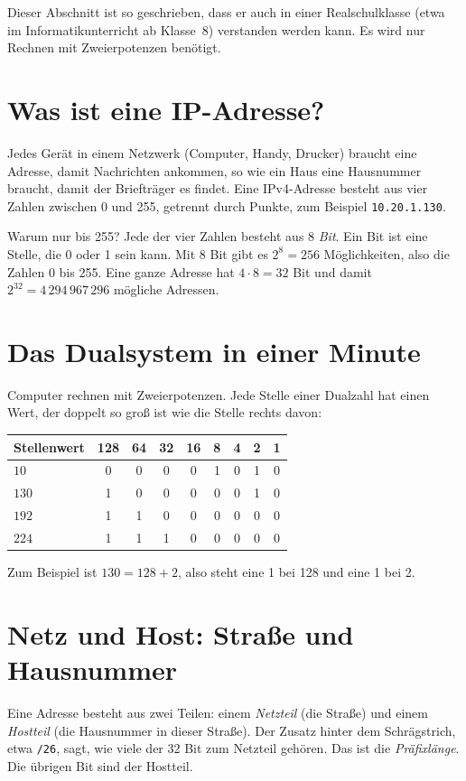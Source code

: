 \documentclass[a4paper,12pt, twoside]{report}
\theoremstyle{definition}
\begin{document}
Dieser Abschnitt ist so geschrieben, dass er auch in einer Realschulklasse (etwa im Informatikunterricht ab Klasse~8) verstanden werden kann. Es wird nur Rechnen mit Zweierpotenzen benötigt.

\section{Was ist eine IP-Adresse?}

Jedes Gerät in einem Netzwerk (Computer, Handy, Drucker) braucht eine Adresse, damit Nachrichten ankommen, so wie ein Haus eine Hausnummer braucht, damit der Briefträger es findet. Eine IPv4-Adresse besteht aus vier Zahlen zwischen 0 und 255, getrennt durch Punkte, zum Beispiel \texttt{10.20.1.130}.

Warum nur bis 255? Jede der vier Zahlen besteht aus 8 \emph{Bit}. Ein Bit ist eine Stelle, die 0 oder 1 sein kann. Mit 8 Bit gibt es $2^8 = 256$ Möglichkeiten, also die Zahlen 0 bis 255. Eine ganze Adresse hat $4\cdot 8 = 32$ Bit und damit $2^{32} = 4\,294\,967\,296$ mögliche Adressen.

\section{Das Dualsystem in einer Minute}

Computer rechnen mit Zweierpotenzen. Jede Stelle einer Dualzahl hat einen Wert, der doppelt so groß ist wie die Stelle rechts davon:
\begin{center}
\begin{tabular}{lcccccccc}
\toprule
Stellenwert & 128 & 64 & 32 & 16 & 8 & 4 & 2 & 1 \\
\midrule
$10$ & 0 & 0 & 0 & 0 & 1 & 0 & 1 & 0 \\
$130$ & 1 & 0 & 0 & 0 & 0 & 0 & 1 & 0 \\
$192$ & 1 & 1 & 0 & 0 & 0 & 0 & 0 & 0 \\
$224$ & 1 & 1 & 1 & 0 & 0 & 0 & 0 & 0 \\
\bottomrule
\end{tabular}
\end{center}
Zum Beispiel ist $130 = 128 + 2$, also steht eine 1 bei 128 und eine 1 bei 2.

\section{Netz und Host: Straße und Hausnummer}

Eine Adresse besteht aus zwei Teilen: einem \emph{Netzteil} (die Straße) und einem \emph{Hostteil} (die Hausnummer in dieser Straße). Der Zusatz hinter dem Schrägstrich, etwa \texttt{/26}, sagt, wie viele der 32 Bit zum Netzteil gehören. Das ist die \emph{Präfixlänge}. Die übrigen Bit sind der Hostteil.
\end{document}
